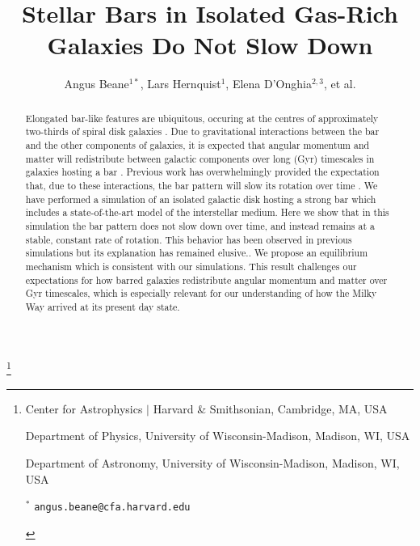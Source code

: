 \documentclass{natureprintstyle}
\title{Stellar Bars in Isolated Gas-Rich Galaxies Do Not Slow Down}
\author{Angus Beane$^{1*}$, Lars Hernquist$^1$, Elena D'Onghia$^{2,3}$, et al.}
\begin{document}
\maketitle

\let\thefootnote\relax\footnote{

\begin{affiliations}
\item Center for Astrophysics $|$ Harvard \& Smithsonian,  Cambridge, MA, USA

\item Department of Physics, University of Wisconsin-Madison, Madison, WI, USA

\item Department of Astronomy, University of Wisconsin-Madison, Madison, WI, USA

$^{*}$ \texttt{\mbox{angus.beane@cfa.harvard.edu}}

\end{affiliations}
}

\vspace{-3.5mm}
\begin{abstract}
  
  Elongated bar-like features are ubiquitous, occuring at the centres of
  approximately two-thirds of spiral disk galaxies \cite{2000AJ....119..536E,
  2007ApJ...657..790M}. Due to gravitational interactions between the bar and
  the other components of galaxies, it is expected that angular momentum and
  matter will redistribute between galactic components over long (Gyr)
  timescales in galaxies hosting a bar \cite{1972MNRAS.157....1L,
  1984MNRAS.209..729T, 1985MNRAS.213..451W}. Previous work has overwhelmingly
  provided the expectation that, due to these interactions, the bar pattern
  will slow its rotation over time \cite{1992ApJ...400...80H,
  2000ApJ...543..704D, 2002MNRAS.330...35A, 2002ApJ...569L..83A,
  2003MNRAS.341.1179A, 2003MNRAS.346..251O, 2005MNRAS.363..991H,
  2006ApJ...637..214M, 2007MNRAS.375..460W, 2009ApJ...697..293D}. We have
  performed a simulation of an isolated galactic disk hosting a strong bar
  which includes a state-of-the-art model of the interstellar medium. Here we
  show that in this simulation the bar pattern does not slow down over time,
  and instead remains at a stable, constant rate of rotation. This behavior
  has been observed in previous simulations but its explanation has remained
  elusive.\cite{1993AA...268...65F, 2010ApJ...719.1470V}. We propose an
  equilibrium mechanism which is consistent with our simulations. This result
  challenges our expectations for how barred galaxies redistribute angular
  momentum and matter over Gyr timescales, which is especially relevant for
  our understanding of how the Milky Way arrived at its present day state.
  
\end{abstract}
\end{document}
